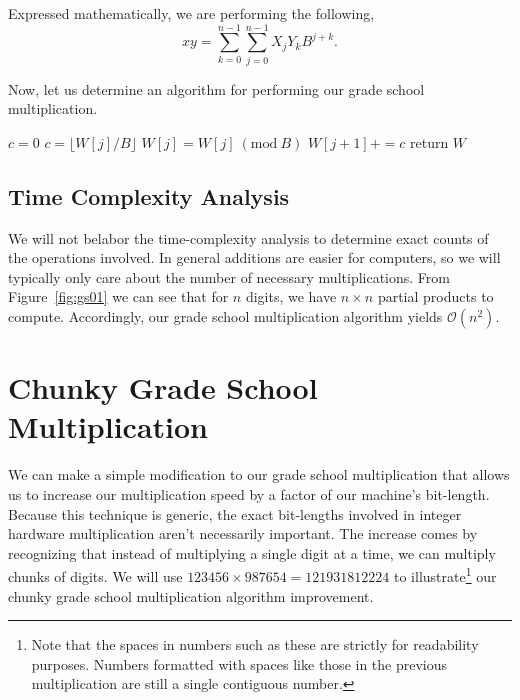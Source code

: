\documentclass[psamsfonts,reqno]{amsart}
\newcommand{\Mod}[1]{\ (\mathrm{mod}\ #1)}
\theoremstyle{definition}
\theoremstyle{remark}
\numberwithin{equation}{section}
\begin{document}
Expressed mathematically, we are performing the following,
\begin{equation}
	\label{gsmul}
	xy = \sum_{k=0}^{n-1}\sum_{j=0}^{n-1}X_jY_kB^{j+k}.
\end{equation}

Now, let us determine an algorithm for performing our grade school multiplication. 
\begin{algorithm}
	\caption{Grade School Multiplication}
	\label{gs_mult_algo}
	\begin{algorithmic}
		\EndFor
	\EndFor
	\State $c = 0$
		\State $c = \lfloor W[j] / B \rfloor$				
		\State $W[j] = W[j] \Mod{B}$
		\State $W[j+1] += c$
	\EndFor
	\State return $W$
\end{algorithmic}
\end{algorithm}

\subsection{Time Complexity Analysis \nopunct}

We will not belabor the time-complexity analysis to determine exact counts of the operations involved. In general additions are easier for computers, so we will typically only care about the number of necessary multiplications. From Figure~\ref{fig:gs01} we can see that for $n$ digits, we have $n \times n$ partial products to compute. Accordingly, our grade school multiplication algorithm yields $\mathcal{O}(n^2)$.

\section{Chunky Grade School Multiplication}

We can make a simple modification to our grade school multiplication that allows us to increase our multiplication speed by a factor of our machine's bit-length. Because this technique is generic, the exact bit-lengths involved in integer hardware multiplication aren't necessarily important. The increase comes by recognizing that instead of multiplying a single digit at a time, we can multiply chunks of digits. We will use $\num{123456} \times \num{987654} = \num{121931812224}$ to illustrate\footnote{Note that the spaces in numbers such as these are strictly for readability purposes. Numbers formatted with spaces like those in the previous multiplication are still a single contiguous number.} our chunky grade school multiplication algorithm improvement.
\end{document}
